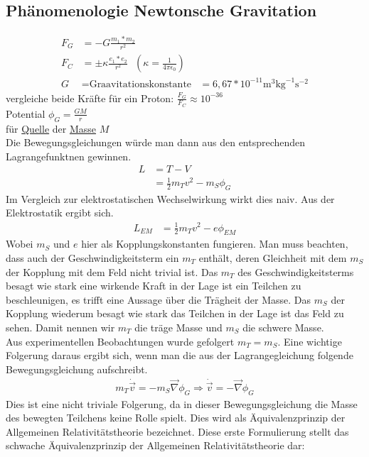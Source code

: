 \documentclass[a4paper]{article}
\begin{document}
\subsection{Phänomenologie Newtonsche Gravitation}
\begin{align}
F_G&=-G\frac{m_1*m_2}{r^2}\\
F_C&=\pm\kappa\frac{e_1*e_2}{r^2} \ \ \ \left( \kappa=\frac{1}{4\pi\epsilon_0}
\right)\\
G&=\text{Graavitationskonstante}
&=6,67*10^{-11}\mathrm{m}^3 \mathrm{kg}^{-1} \mathrm{s}^{-2}
\end{align}
vergleiche beide Kräfte für ein Proton: $\frac{F_G}{F_C}\approx10^{-36}$\\
Potential $\phi_G=\frac{GM}{r}$\\
für \underline{Quelle} der \underline{Masse} $M$\\
Die Bewegungsgleichungen würde man dann aus den entsprechenden Lagrangefunktnen
gewinnen.
\begin{align}
L&=T-V\\
&=\frac{1}{2}m_Tv^2-m_S\phi_G
\end{align}
Im Vergleich zur elektrostatischen Wechselwirkung wirkt dies naiv. Aus der
Elektrostatik ergibt sich.
\begin{align}
L_{EM}&=\frac{1}{2}m_Tv^2-e\phi_{EM}
\end{align}
Wobei $m_S$ und $e$ hier als Kopplungskonstanten fungieren.
Man muss beachten, dass auch der Geschwindigkeitsterm ein $m_T$ enthält, deren
Gleichheit mit dem $m_S$ der Kopplung mit dem Feld nicht trivial ist. Das $m_T$
des Geschwindigkeitsterms besagt wie stark eine wirkende Kraft in der Lage ist ein
Teilchen zu beschleunigen, es trifft eine Aussage über die Trägheit der Masse.
Das $m_S$ der Kopplung wiederum besagt wie stark das Teilchen in der Lage ist
das Feld zu sehen. Damit nennen wir $m_T$ die träge Masse und $m_S$ die schwere
Masse.\\
Aus experimentellen Beobachtungen wurde gefolgert $m_T=m_S$. Eine wichtige
Folgerung daraus ergibt sich, wenn man die aus der Lagrangegleichung folgende
Bewegungsgleichung aufschreibt.
\begin{align}
m_T \dot{\vec{v}}=-m_S \vec{\nabla}\phi_G
\Rightarrow \dot{\vec{v}}=- \vec{\nabla}\phi_G
\end{align}
Dies ist eine nicht triviale Folgerung, da in dieser Bewegungsgleichung die Masse
des bewegten Teilchens keine Rolle spielt. Dies wird als Äquivalenzprinzip der
Allgemeinen Relativitätstheorie bezeichnet. Diese erste Formulierung stellt das
schwache Äquivalenzprinzip der Allgemeinen Relativitätstheorie dar:\\
\\
\end{document}
